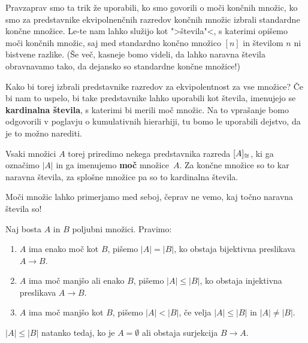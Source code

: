 Pravzaprav smo ta trik že uporabili, ko smo govorili o moči končnih množic, ko smo za predstavnike ekvipolnenčnih razredov končnih množic izbrali standardne končne množice. Le-te nam lahko služijo kot ">števila"<, s katerimi opišemo moči končnih množic, saj med standardno končno množico $[n]$ in številom $n$ ni bistvene razlike. (Še več, kasneje bomo videli, da lahko naravna števila obravnavamo tako, da dejansko so standardne končne množice!)

Kako bi torej izbrali predstavnike razredov za ekvipolentnost za vse množice?
Če bi nam to uspelo, bi take predstavnike lahko uporabili kot števila, imenujejo se \textbf{kardinalna števila}, s katerimi bi merili moč množic.
Na to vprašanje bomo odgovorili v poglavju o kumulativnih hierarhiji, tu bomo le uporabili dejstvo, da je to možno narediti.

Vsaki množici $A$ torej priredimo nekega predstavnika razreda $[A]_{\cong}$, ki ga označimo $|A|$ in ga imenujemo \textbf{moč} množice~$A$. Za končne množice so to kar naravna števila, za splošne množice pa so to kardinalna števila.

Moči množic lahko primerjamo med seboj, čeprav ne vemo, kaj točno naravna števila so!

\begin{definicija}
  Naj bosta $A$ in $B$ poljubni množici. Pravimo:
  \begin{enumerate}
  \item $A$ ima enako moč kot $B$, pišemo $|A| = |B|$, ko obstaja bijektivna preslikava $A \to B$.
  \item $A$ ima moč manjšo ali enako $B$, pišemo $|A| \leq |B|$, ko obstaja injektivna preslikava $A \to B$.
  \item $A$ ima moč manjšo kot $B$, pišemo $|A| < |B|$, če velja $|A| \leq |B|$ in $|A| \neq |B|$.
  \end{enumerate}
\end{definicija}

\begin{izrek}
  \label{izr:leq-iff-empty-or-onto}
  $|A| \leq |B|$ natanko tedaj, ko je $A = \emptyset$ ali obstaja surjekcija $B \to A$.
\end{izrek}

